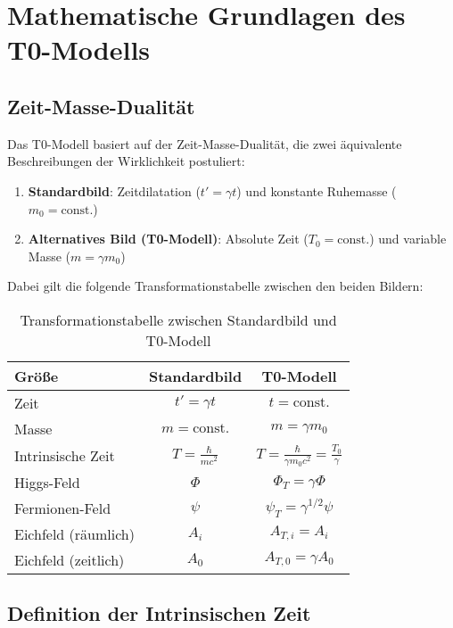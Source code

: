 \documentclass[a4paper,12pt]{article}
\theoremstyle{definition}
\theoremstyle{remark}
\begin{document}
	\section{Mathematische Grundlagen des T0-Modells}
	
	\subsection{Zeit-Masse-Dualität}
	
	Das T0-Modell basiert auf der Zeit-Masse-Dualität, die zwei äquivalente Beschreibungen der Wirklichkeit postuliert:
	
	\begin{enumerate}
		\item \textbf{Standardbild}: Zeitdilatation ($t' = \gamma t$) und konstante Ruhemasse ($m_0 = \text{const.}$)
		\item \textbf{Alternatives Bild (T0-Modell)}: Absolute Zeit ($T_0 = \text{const.}$) und variable Masse ($m = \gamma m_0$)
	\end{enumerate}
	
	Dabei gilt die folgende Transformationstabelle zwischen den beiden Bildern:
	
	\begin{table}[h]
		\centering
		\begin{tabular}{|l|c|c|}
			\hline
			\textbf{Größe} & \textbf{Standardbild} & \textbf{T0-Modell} \\
			\hline
			Zeit & $t' = \gamma t$ & $t = \text{const.}$ \\
			Masse & $m = \text{const.}$ & $m = \gamma m_0$ \\
			Intrinsische Zeit & $T = \frac{\hbar}{mc^2}$ & $T = \frac{\hbar}{\gamma m_0c^2} = \frac{T_0}{\gamma}$ \\
			Higgs-Feld & $\Phi$ & $\Phi_T = \gamma \Phi$ \\
			Fermionen-Feld & $\psi$ & $\psi_T = \gamma^{1/2} \psi$ \\
			Eichfeld (räumlich) & $A_i$ & $A_{T,i} = A_i$ \\
			Eichfeld (zeitlich) & $A_0$ & $A_{T,0} = \gamma A_0$ \\
			\hline
		\end{tabular}
		\caption{Transformationstabelle zwischen Standardbild und T0-Modell}
	\end{table}
	
	\subsection{Definition der Intrinsischen Zeit}
	
\end{document}
